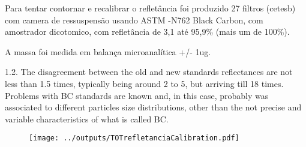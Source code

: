Para tentar contornar e recalibrar o refletância foi produzido 27 filtros (cetesb) com camera de ressuspensão
usando ASTM -N762 Black Carbon, com amostrador dicotomico, com refletância de 3,1 até 95,9\% (mais um de 100\%).

A massa foi medida em balança microanalítica +/- 1ug.







1.2. The disagreement between the old and new standards reflectances are not less than 1.5 times, typically being around 2 to 5, but arriving till 18 times. Problems with BC standards are known and, in this case, probably was associated to different particles size distributions, other than the not precise and variable characteristics of what is called BC.





\begin{table}[H]
  \centering
  \begin{scriptsize}
    
  \end{scriptsize}
\end{table}


\begin{figure}[H]
\begin{center}
  \texttt{[image: ../outputs/TOTrefletanciaCalibration.pdf]}
  \caption{}
\end{center}
\end{figure}
  




